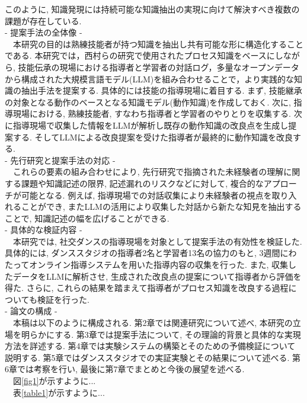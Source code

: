 このように, 知識発現には持続可能な知識抽出の実現に向けて解決すべき複数の課題が存在している.\\

- 提案手法の全体像 -\\
　本研究の目的は熟練技能者が持つ知識を抽出し共有可能な形に構造化することである. 本研究では，西村らの研究\cite{Nishimura2017}で使用されたプロセス知識をベースにしながら, 技能伝承の現場における指導者と学習者の対話ログ，多量なオープンデータから構成された大規模言語モデル(LLM)を組み合わせることで，より実践的な知識の抽出手法を提案する. 具体的には技能の指導現場に着目する. まず, 技能継承の対象となる動作のベースとなる知識モデル(動作知識)を作成しておく. 次に, 指導現場における, 熟練技能者, すなわち指導者と学習者のやりとりを収集する. 次に指導現場で収集した情報をLLMが解析し既存の動作知識の改良点を生成し提案する. そしてLLMによる改良提案を受けた指導者が最終的に動作知識を改良する.\\

- 先行研究と提案手法の対応 -\\
　これらの要素の組み合わせにより, 先行研究で指摘された未経験者の理解に関する課題や知識記述の限界, 記述漏れのリスクなどに対して, 複合的なアプローチが可能となる. 例えば, 指導現場での対話収集により未経験者の視点を取り入れることができ, またLLMの活用により収集した対話から新たな知見を抽出することで, 知識記述の幅を広げることができる.\\

- 具体的な検証内容 -\\
　本研究では, 社交ダンスの指導現場を対象として提案手法の有効性を検証した. 具体的には, ダンススタジオの指導者2名と学習者13名の協力のもと, 3週間にわたってオンライン指導システムを用いた指導内容の収集を行った. また, 収集したデータをLLMに解析させ, 生成された改良点の提案について指導者から評価を得た. さらに, これらの結果を踏まえて指導者がプロセス知識を改良する過程についても検証を行った.\\

- 論文の構成 -\\
　本稿は以下のように構成される. 第2章では関連研究について述べ, 本研究の立場を明らかにする. 第3章では提案手法について, その理論的背景と具体的な実現方法を詳述する. 第4章では実験システムの構築とそのための予備検証について説明する. 第5章ではダンススタジオでの実証実験とその結果について述べる. 第6章では考察を行い, 最後に第7章でまとめと今後の展望を述べる.\\


　図\ref{fig1}が示すように...\\
　表\ref{table1}が示すように...\\

